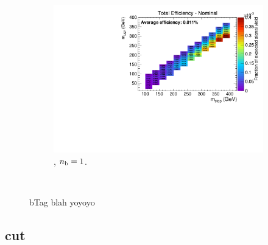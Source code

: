 \begin{figure}[ht!]
\begin{subfigure}[b]{0.32\textwidth}
    \includegraphics[width=\textwidth, page=6]{Figs/sms/t2degen/v5/bTag_T2_4body_v5_eq1b_ge4j_incl.pdf}
    \caption{\njhigh, $n_{\text{b}} = 1$.}
  \end{subfigure}\\
  \caption{bTag blah yoyoyo}
  \label{fig:sms-btag-t2degen}
\end{figure}


\newpage
\subsection*{\mhtmet cut}
\label{sec:t2degen_mhtmet_plots}


